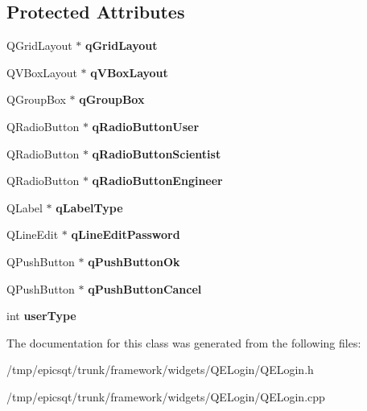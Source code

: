 \subsection*{Protected Attributes}
\begin{DoxyCompactItemize}
\item 
\hypertarget{class__QDialogLogin_acd6c8425659829999e5b8440e775d088}{
QGridLayout $\ast$ {\bfseries qGridLayout}}
\label{class__QDialogLogin_acd6c8425659829999e5b8440e775d088}

\item 
\hypertarget{class__QDialogLogin_a11a1a0b4f330ab6f352b2afd8e576f34}{
QVBoxLayout $\ast$ {\bfseries qVBoxLayout}}
\label{class__QDialogLogin_a11a1a0b4f330ab6f352b2afd8e576f34}

\item 
\hypertarget{class__QDialogLogin_a14d2c9d27f952d1c8affb7419c2f22d7}{
QGroupBox $\ast$ {\bfseries qGroupBox}}
\label{class__QDialogLogin_a14d2c9d27f952d1c8affb7419c2f22d7}

\item 
\hypertarget{class__QDialogLogin_a22684a80faee4e0cf498702ee8ed5486}{
QRadioButton $\ast$ {\bfseries qRadioButtonUser}}
\label{class__QDialogLogin_a22684a80faee4e0cf498702ee8ed5486}

\item 
\hypertarget{class__QDialogLogin_af76cc30f081315f1691e39d6ca509c19}{
QRadioButton $\ast$ {\bfseries qRadioButtonScientist}}
\label{class__QDialogLogin_af76cc30f081315f1691e39d6ca509c19}

\item 
\hypertarget{class__QDialogLogin_a4989715175999ca25b0d89649c16bdf2}{
QRadioButton $\ast$ {\bfseries qRadioButtonEngineer}}
\label{class__QDialogLogin_a4989715175999ca25b0d89649c16bdf2}

\item 
\hypertarget{class__QDialogLogin_ab98b75ef46d7e9c6a38c5024f92e78b5}{
QLabel $\ast$ {\bfseries qLabelType}}
\label{class__QDialogLogin_ab98b75ef46d7e9c6a38c5024f92e78b5}

\item 
\hypertarget{class__QDialogLogin_a51025904c539c9fa45b390b0da446e43}{
QLineEdit $\ast$ {\bfseries qLineEditPassword}}
\label{class__QDialogLogin_a51025904c539c9fa45b390b0da446e43}

\item 
\hypertarget{class__QDialogLogin_a606174afc272de10ffaf7edfde1dc97d}{
QPushButton $\ast$ {\bfseries qPushButtonOk}}
\label{class__QDialogLogin_a606174afc272de10ffaf7edfde1dc97d}

\item 
\hypertarget{class__QDialogLogin_aa250f6d3a6e2169fb6743245ca7f9964}{
QPushButton $\ast$ {\bfseries qPushButtonCancel}}
\label{class__QDialogLogin_aa250f6d3a6e2169fb6743245ca7f9964}

\item 
\hypertarget{class__QDialogLogin_a7c77758bf70db293b6d2f7e6d39686bf}{
int {\bfseries userType}}
\label{class__QDialogLogin_a7c77758bf70db293b6d2f7e6d39686bf}

\end{DoxyCompactItemize}


The documentation for this class was generated from the following files:\begin{DoxyCompactItemize}
\item 
/tmp/epicsqt/trunk/framework/widgets/QELogin/QELogin.h\item 
/tmp/epicsqt/trunk/framework/widgets/QELogin/QELogin.cpp\end{DoxyCompactItemize}
